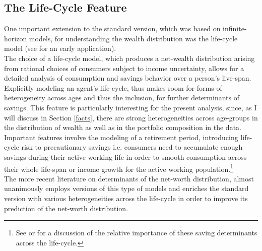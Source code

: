 \documentclass[a4paper,12pt,legno]{article}
\begin{document}
\subsection{The Life-Cycle Feature}
One important extension to the standard version, which was based on infinite-horizon models, for understanding the wealth distribution was the life-cycle model (see \cite{huggett1996wealth} for an early application).\\
The choice of a life-cycle model, which produces a net-wealth distribution arising from rational choices of consumers subject to income uncertainty, allows for a detailed analysis of consumption and savings behavior over a person's live-span. 
Explicitly modeling an agent's life-cycle, thus makes room for forms of heterogeneity across ages and thus the inclusion, for further determinants of savings. This feature is particularly interesting for the present analysis, since, as I will discuss in Section \ref{facts}, there are strong heterogeneities across age-groups in the distribution of wealth as well as in the portfolio composition in the data.\\
Important features involve the modeling of a retirement period, introducing life-cycle risk to precautionary savings i.e. consumers need to accumulate enough savings during their active working life in order to smooth consumption across their whole life-span or income growth for the active working population.\footnote{See \cite{cagetti2003} or \cite{Gourinchas&Parker2002} for a discussion of the relative importance of these saving determinants across the life-cycle.}
\\
The more recent literature on determinants of the net-worth distribution, almost unanimously employs versions of this type of models and enriches the standard version with various heterogeneities across the life-cycle in order to improve its prediction of the net-worth distribution.
\end{document}
